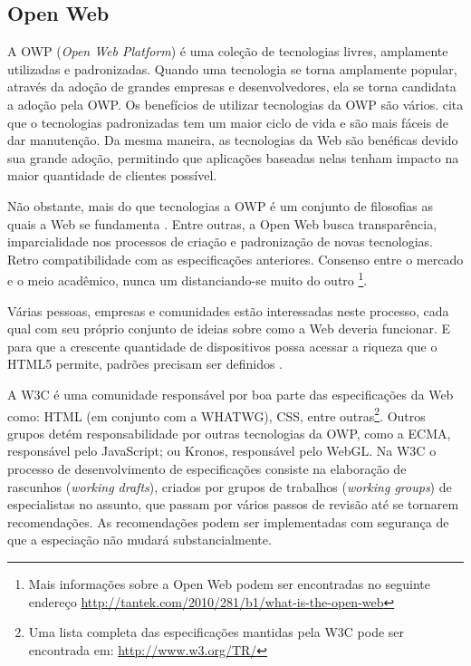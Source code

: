 \subsection{Open Web}

A OWP (\textit{Open Web Platform}) é uma coleção de tecnologias
livres, amplamente utilizadas e padronizadas. Quando uma tecnologia
se torna amplamente popular, através da adoção de grandes empresas
e desenvolvedores, ela se torna candidata a adoção pela OWP. Os
benefícios de utilizar tecnologias da OWP são vários. \citet[p.
3]{svgTime} cita que o tecnologias padronizadas tem um maior ciclo de
vida e são mais fáceis de dar manutenção. Da mesma maneira, as tecnologias
da Web são benéficas devido sua grande adoção, permitindo que
aplicações baseadas nelas tenham impacto na maior quantidade de
clientes possível.

Não obstante, mais do que tecnologias a OWP é um conjunto de
filosofias as quais a Web se fundamenta \autocite{openWebDefinition}.
Entre outras, a Open Web busca transparência, imparcialidade nos
processos de criação e padronização de novas tecnologias.
Retro compatibilidade com as especificações anteriores.
Consenso entre o mercado e o meio acadêmico, nunca um
distanciando-se muito do outro \footnote{Mais informações
sobre a Open Web podem ser encontradas no seguinte endereço
\url{http://tantek.com/2010/281/b1/what-is-the-open-web}}.

Várias pessoas, empresas e comunidades estão interessadas neste
processo, cada qual com seu próprio conjunto de ideias sobre como
a Web deveria funcionar. E para que a crescente quantidade de
dispositivos possa acessar a riqueza que o HTML5 permite, padrões
precisam ser definidos \autocite[p. 5]{aSeriousContender}.

A W3C é uma comunidade responsável por boa parte das especificações
da Web como: HTML (em conjunto com a WHATWG), CSS, entre
outras\footnote{Uma lista completa das especificações mantidas pela
W3C pode ser encontrada em: \url{http://www.w3.org/TR/}}. Outros grupos
detém responsabilidade por outras tecnologias da OWP, como a ECMA,
responsável pelo JavaScript; ou Kronos, responsável pelo WebGL. Na
W3C o processo de desenvolvimento de especificações consiste na
elaboração de rascunhos (\textit{working drafts}), criados por grupos
de trabalhos (\textit{working groups}) de especialistas no assunto, que
passam por vários passos de revisão até se tornarem recomendações.
As recomendações podem ser implementadas com segurança de que a
especiação não mudará substancialmente.

